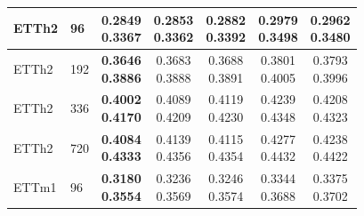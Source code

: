 \begin{center}
\begin{minipage}{\textwidth}
\begin{tabular}{@{}llccccc@{}}
ETTh2 & 96 & \shortstack{\colorbox[gray]{0.82}{\textbf{0.2849}}\\\colorbox[gray]{0.92}{0.3367}} & \shortstack{\colorbox[gray]{0.92}{0.2853}\\\colorbox[gray]{0.82}{\textbf{0.3362}}} & \shortstack{0.2882\\0.3392} & \shortstack{0.2979\\0.3498} & \shortstack{0.2962\\0.3480} \\ \hline

ETTh2 & 192 & \shortstack{\colorbox[gray]{0.82}{\textbf{0.3646}}\\\colorbox[gray]{0.82}{\textbf{0.3886}}} & \shortstack{\colorbox[gray]{0.92}{0.3683}\\\colorbox[gray]{0.92}{0.3888}} & \shortstack{0.3688\\0.3891} & \shortstack{0.3801\\0.4005} & \shortstack{0.3793\\0.3996} \\ \hline

ETTh2 & 336 & \shortstack{\colorbox[gray]{0.82}{\textbf{0.4002}}\\\colorbox[gray]{0.82}{\textbf{0.4170}}} & \shortstack{\colorbox[gray]{0.92}{0.4089}\\\colorbox[gray]{0.92}{0.4209}} & \shortstack{0.4119\\0.4230} & \shortstack{0.4239\\0.4348} & \shortstack{0.4208\\0.4323} \\ \hline

ETTh2 & 720 & \shortstack{\colorbox[gray]{0.82}{\textbf{0.4084}}\\\colorbox[gray]{0.82}{\textbf{0.4333}}} & \shortstack{0.4139\\0.4356} & \shortstack{\colorbox[gray]{0.92}{0.4115}\\\colorbox[gray]{0.92}{0.4354}} & \shortstack{0.4277\\0.4432} & \shortstack{0.4238\\0.4422} \\ \hline

ETTm1 & 96 & \shortstack{\colorbox[gray]{0.82}{\textbf{0.3180}}\\\colorbox[gray]{0.82}{\textbf{0.3554}}} & \shortstack{\colorbox[gray]{0.92}{0.3236}\\\colorbox[gray]{0.92}{0.3569}} & \shortstack{0.3246\\0.3574} & \shortstack{0.3344\\0.3688} & \shortstack{0.3375\\0.3702} \\ \hline


\end{tabular}
\end{minipage}
\end{center}
